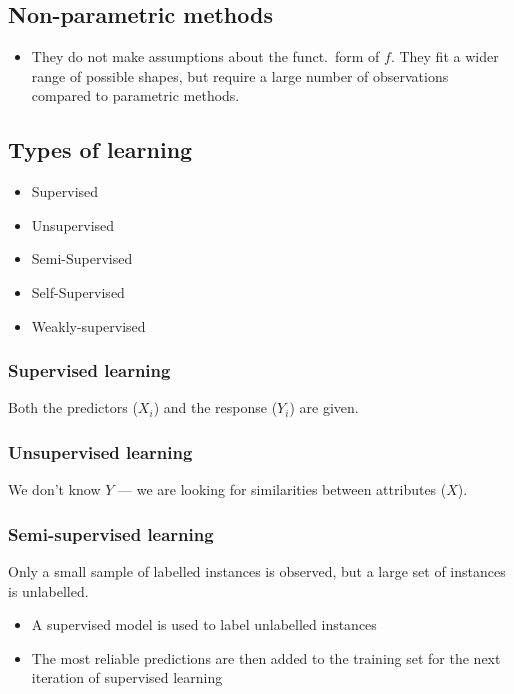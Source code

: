 \documentclass{article}
\begin{document}
    \subsection{Non-parametric methods}
    \begin{itemize}
        \item They do not make assumptions about the funct.\ form of $f$. They fit a wider range of possible shapes, but require a large number of observations compared to parametric methods.
    \end{itemize}

    \subsection{Types of learning}
    \begin{itemize}
        \item Supervised
        \item Unsupervised
        \item Semi-Supervised
        \item Self-Supervised
        \item Weakly-supervised
    \end{itemize}

        \subsubsection{Supervised learning}
        Both the predictors ($X_i$) and the response ($Y_i$) are given.

        \subsubsection{Unsupervised learning}
        We don't know $Y$ --- we are looking for similarities between attributes ($X$).

        \subsubsection{Semi-supervised learning}
        Only a small sample of labelled instances is observed, but a large set of instances is unlabelled.
        \begin{itemize}
            \item A supervised model is used to label unlabelled instances
            \item The most reliable predictions are then added to the training set for the next iteration of supervised learning
        \end{itemize}
\end{document}
